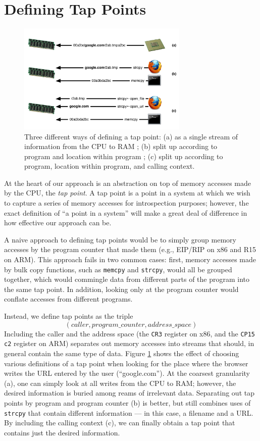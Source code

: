 \section{Defining Tap Points}
\label{sec:tapdef}

\begin{figure}[t]
\begin{center}
\includegraphics[width=3.2in]{tappoint.pdf}
\end{center}
\caption{Three different ways of defining a tap point: (a) as a single
stream of information from the CPU to RAM ; (b) split up according to
program and location within program ; (c) split up according to program,
location within program, and calling context.}
\label{fig:tappoint}
\end{figure}

At the heart of our approach is an abstraction on top of memory accesses
made by the CPU, the \emph{tap point}. A tap point is a point in a
system at which we wish to capture a series of memory accesses for
introspection purposes; however, the exact definition of ``a point in a
system'' will make a great deal of difference in how effective our
approach can be.

A naive approach to defining tap points would be to simply group memory
accesses by the program counter that made them (e.g., EIP/RIP on x86 and
R15 on ARM). This approach fails in two common cases: first, memory
accesses made by bulk copy functions, such as \texttt{memcpy} and
\texttt{strcpy}, would all be grouped together, which would commingle
data from different parts of the program into the same tap point. In
addition, looking only at the program counter would conflate accesses
from different programs.

Instead, we define tap points as the triple
\[ (caller, program\_counter, address\_space) \]
Including the caller and the address space (the \texttt{CR3} register on
x86, and the \texttt{CP15 c2} register on ARM) separates out memory
accesses into streams that should, in general contain the same type of
data. Figure \ref{fig:tappoint} shows the effect of choosing various
definitions of a tap point when looking for the place where the browser
writes the URL entered by the user (``google.com''). At the coarsest
granularity (a), one can simply look at all writes from the CPU to RAM;
however, the desired information is buried among reams of irrelevant
data.  Separating out tap points by program and program counter (b) is
better, but still combines uses of \texttt{strcpy} that contain
different information --- in this case, a filename and a URL. By
including the calling context (c), we can finally obtain a tap point
that contains just the desired information.

